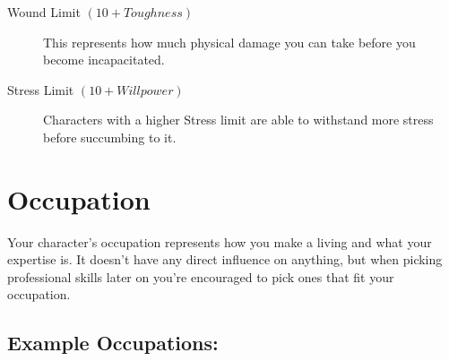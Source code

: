 \begin{description}


    \item[Wound Limit $(10 + Toughness)$] 
    This represents how much physical damage you can take before you become incapacitated.
    
    \item[Stress Limit $(10 + Willpower)$] 
    Characters with a higher Stress limit are able to withstand more stress before succumbing to it.

\end{description}




\section{Occupation}
Your character's occupation represents how you make a living and what your expertise is.
It doesn't have any direct influence on anything, 
but when picking professional skills later on you're encouraged to 
pick ones that fit your occupation. 

\subsection{Example Occupations:}

